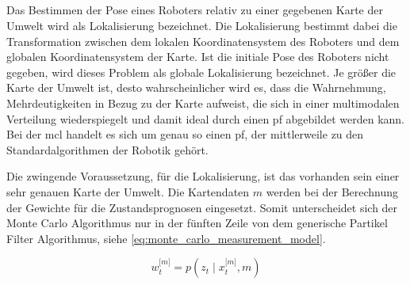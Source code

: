 %
%
\subsection{}

Das Bestimmen der Pose eines Roboters relativ zu einer gegebenen Karte der Umwelt wird als Lokalisierung bezeichnet. Die Lokalisierung bestimmt dabei die Transformation zwischen dem lokalen Koordinatensystem des Roboters und dem globalen Koordinatensystem der Karte. Ist die initiale Pose des Roboters nicht gegeben, wird dieses Problem als globale Lokalisierung bezeichnet. Je größer die Karte der Umwelt ist, desto wahrscheinlicher wird es, dass die Wahrnehmung, Mehrdeutigkeiten in Bezug zu der Karte aufweist, die sich in einer multimodalen Verteilung wiederspiegelt und damit ideal durch einen \Gls{pf} abgebildet werden kann. Bei der \Gls{mcl} handelt es sich um genau so einen \Gls{pf}, der mittlerweile zu den Standardalgorithmen der Robotik gehört.

Die zwingende Voraussetzung, für die Lokalisierung, ist das vorhanden sein einer sehr genauen Karte der Umwelt. Die Kartendaten $m$ werden bei der Berechnung der Gewichte für die Zustandsprognosen eingesetzt. Somit unterscheidet sich der Monte Carlo Algorithmus nur in der fünften Zeile von dem generische Partikel Filter Algorithmus, siehe \autoref{eq:monte_carlo_measurement_model}. 

\begin{equation}
w^{\lbrack m \rbrack}_t = p(z_t \mid x^{\lbrack m \rbrack}_t, m) \label{eq:monte_carlo_measurement_model}
\end{equation}

%

